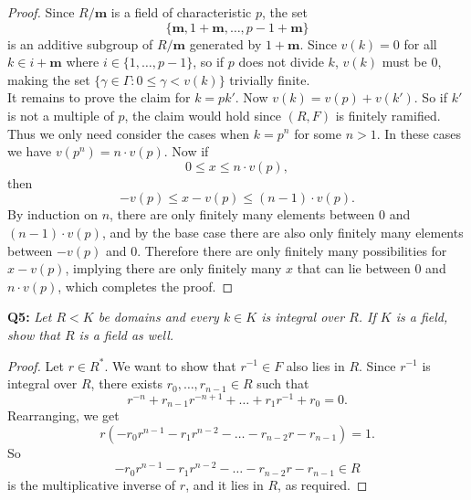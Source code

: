 \documentclass{article}
\begin{document}
  \begin{proof}
    Since $R/\bm{m}$ is a field of characteristic $p$, the set
    \[\{\bm{m},1+\bm{m},\ldots,p-1+\bm{m}\}\]
    is an additive subgroup of $R/\bm{m}$ generated by $1+\bm{m}$.
    Since $v(k)=0$ for all $k\in i+\bm{m}$ where $i\in\{1,\ldots,p-1\}$,
    so if $p$ does not divide $k$, $v(k)$ must be 0, making the set
    $\{\gamma\in\Gamma: 0\leq\gamma<v(k)\}$ trivially finite. \\

    It remains to prove the claim for $k=pk'$. Now $v(k)=v(p)+v(k')$. So if
    $k'$ is not a multiple of $p$, the claim would hold since $(R,F)$ is
    finitely ramified. Thus we only need consider the cases when $k=p^n$ for
    some $n>1$. In these cases we have $v(p^n)=n\cdot v(p)$. Now if
    \[0\leq x\leq n\cdot v(p),\]
    then
    \[-v(p)\leq x-v(p)\leq (n-1)\cdot v(p).\]
    By induction on $n$, there are only finitely many elements between $0$
    and $(n-1)\cdot v(p)$, and by the base case there are also only
    finitely many elements between $-v(p)$ and $0$. Therefore there are
    only finitely many possibilities for $x-v(p)$, implying there are only
    finitely many $x$ that can lie between 0 and $n\cdot v(p)$, which
    completes the proof.
  \end{proof}

\textbf{Q5:} \it Let $R<K$ be domains and every $k\in K$ is integral over
  $R$. If $K$ is a field, show that $R$ is a field as well.
  \begin{proof}
    Let $r\in R^*$. We want to show that $r^{-1}\in F$ also lies in $R$.
    Since $r^{-1}$ is integral over $R$, there exists
    $r_0,\ldots,r_{n-1}\in R$ such that
    \[r^{-n}+r_{n-1}r^{-n+1} +\ldots +r_1r^{-1}+r_0=0.\]
    Rearranging, we get
    \[r(-r_0r^{n-1} -r_1r^{n-2} -\ldots -r_{n-2}r -r_{n-1}) = 1.\]
    So
    \[-r_0r^{n-1} -r_1r^{n-2} -\ldots -r_{n-2}r -r_{n-1} \in R\]
    is the multiplicative inverse of $r$, and it lies in $R$, as required.
  \end{proof}
\end{document}
